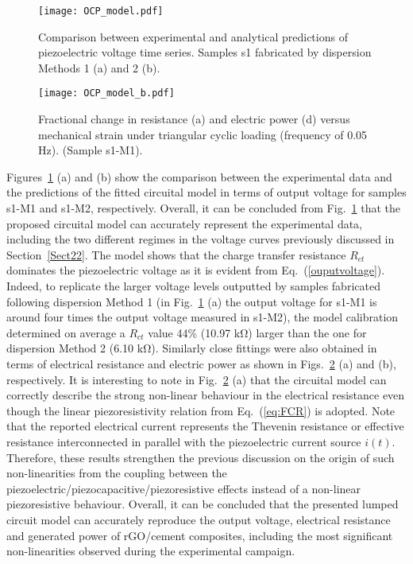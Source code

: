 \documentclass[a4paper,fleqn]{cas-sc}
\begin{document}
\begin{figure}[ht]
\centering
\texttt{[image: OCP\_model.pdf]}
\caption{Comparison between experimental and analytical predictions of piezoelectric voltage time series. Samples s1 fabricated by dispersion Methods 1 (a) and 2 (b).}
\label{model_figs}
\end{figure}

\begin{figure}[ht]
\centering
\texttt{[image: OCP\_model\_b.pdf]}
\caption{Fractional change in resistance (a) and electric power (d) versus mechanical strain under triangular cyclic loading (frequency of 0.05 Hz). (Sample s1-M1).}
\label{model_figs_b}
\end{figure}

Figures~\ref{model_figs} (a) and (b) show the comparison between the experimental data and the predictions of the fitted circuital model in terms of output voltage for samples s1-M1 and s1-M2, respectively. Overall, it can be concluded from Fig.~\ref{model_figs} that the proposed circuital model can accurately represent the experimental data, including the two different regimes in the voltage curves previously discussed in Section~\ref{Sect22}. The model shows that the charge transfer resistance $R_{ct}$ dominates the piezoelectric voltage as it is evident from Eq.~(\ref{ouputvoltage}). Indeed, to replicate the larger voltage levels outputted by samples fabricated following dispersion Method 1 (in Fig.~\ref{model_figs} (a) the output voltage for s1-M1 is around four times the output voltage measured in s1-M2), the model calibration determined on average a $R_{ct}$ value 44\% (10.97 $\mathrm{k\Omega}$) larger than the one for dispersion Method 2 (6.10 $\mathrm{k\Omega}$). Similarly close fittings were also obtained in terms of electrical resistance and electric power as shown in Figs.~\ref{model_figs_b} (a) and (b), respectively. It is interesting to note in Fig.~\ref{model_figs_b} (a) that the circuital model can correctly describe the strong non-linear behaviour in the electrical resistance even though the linear piezoresistivity relation from Eq.~(\ref{eq:FCR}) is adopted. Note that the reported electrical current represents the Thevenin resistance or effective resistance interconnected in parallel with the piezoelectric current source $i(t)$. Therefore, these results strengthen the previous discussion on the origin of such non-linearities from the coupling between the piezoelectric/piezocapacitive/piezoresistive effects instead of a non-linear piezoresistive behaviour. Overall, it can be concluded that the presented lumped circuit model can accurately reproduce the output voltage, electrical resistance and generated power of rGO/cement composites, including the most significant non-linearities observed during the experimental campaign.
\end{document}
